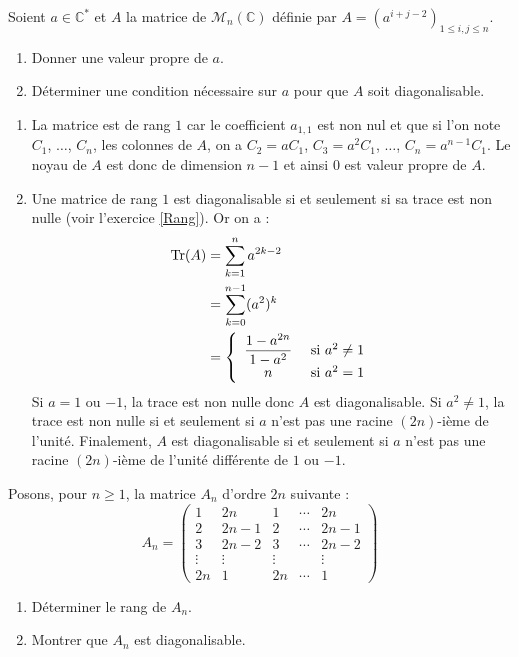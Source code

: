 \documentclass[a4paper,10pt]{report}
\begin{document}
\begin{Exercice}{} Soient $a \in \mathbb{C}^*$ et $A$ la matrice de $\mathcal{M}_n(\mathbb{C})$ définie par $A=( a^{i+j-2})_{1 \leq i,j \leq n}$.

\begin{enumerate}
\item Donner une valeur propre de $a$.
\item Déterminer une condition nécessaire sur $a$ pour que $A$ soit diagonalisable.
\end{enumerate}
\end{Exercice}

\corr 
\begin{enumerate}
\item La matrice est de rang $1$ car le coefficient $a_{1,1}$ est non nul et que si l'on note $C_1$, $\ldots$, $C_n$, les colonnes de $A$, on a $C_2= aC_1$, $C_3=a^2 C_1$, $\ldots$, $C_n=a^{n-1} C_1$. Le noyau de $A$ est donc de dimension $n-1$ et ainsi $0$ est valeur propre de $A$.
\item Une matrice de rang $1$ est diagonalisable si et seulement si sa trace est non nulle (voir l'exercice \ref{Rang}). Or on a :
\begin{align*}
 \textrm{Tr}(A) & = \sum_{k=1}^n a^{2k-2} \\
 & = \sum_{k=0}^{n-1} (a^2)^k \\
 & = \left\lbrace \begin{array}{cl}
 \dfrac{1-a^{2n}}{1-a^2} & \hbox{ si } a^2 \neq 1 \\
 n & \hbox{ si } a^2 = 1 
 \end{array}\right. 
 \end{align*}
 Si $a=1$ ou $-1$, la trace est non nulle donc $A$ est diagonalisable. Si $a^2 \neq 1$, la trace est non nulle si et seulement si $a$ n'est pas une racine $(2n)$-ième de l'unité. Finalement, $A$ est diagonalisable si et seulement si $a$ n'est pas une racine $(2n)$-ième de l'unité différente de $1$ ou $-1$.
\end{enumerate}

\begin{Exercice}{} Posons, pour $n \geq 1$, la matrice $A_n$ d'ordre $2n$ suivante :
$$ A_n = \begin{pmatrix}
1 & 2n & 1 & \cdots & 2n \\
2 & 2n-1 & 2 & \cdots & 2n-1 \\
3 & 2n-2 & 3 & \cdots & 2n-2 \\
\vdots & \vdots & \vdots &  & \vdots \\
2n & 1 & 2n & \cdots & 1
\end{pmatrix}$$

\begin{enumerate}
\item Déterminer le rang de $A_n$.
\item Montrer que $A_n$ est diagonalisable.
\end{enumerate}
\end{Exercice}
\end{document}
